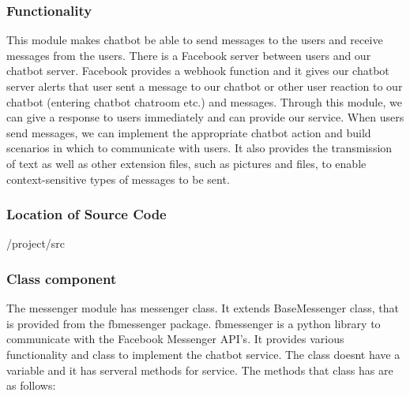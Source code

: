 \subsubsection {Functionality}

This module makes chatbot be able to send messages to the users and receive messages from the users. There is a Facebook server between users and our chatbot server. Facebook provides a webhook function and it gives our chatbot server alerts that user sent a message to our chatbot or other user reaction to our chatbot (entering chatbot chatroom etc.) and messages. Through this module, we can give a response to users immediately and can provide our service. When users send messages, we can implement the appropriate chatbot action and build scenarios in which to communicate with users. It also provides the transmission of text as well as other extension files, such as pictures and files, to enable context-sensitive types of messages to be sent. \newline

\subsubsection {Location of Source Code}

/project/src \newline


\subsubsection {Class component}

The messenger module has messenger class. It extends BaseMessenger class, that is provided from the fbmessenger package. fbmessenger is a python library to communicate with the Facebook Messenger API's. It provides various functionality and class to implement the chatbot service. The class doesnt have a variable and it has serveral methods for service. The methods that class has are as follows: \newline

